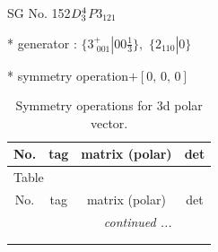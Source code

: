 \documentclass[fleqn,8pt]{jsarticle}
\begin{document}
\setcounter{MaxMatrixCols}{32}

\renewcommand{\tablename}{Table~}
\renewcommand{\figurename}{Figure~}
\begin{center}
\LARGE
SG No. 152\quad$D_{\rm 3}^{4}$\quad$P3_121$\quad[ trigonal ]
\end{center}

* generator : $\{3^{+}_{\,\,001}|0 0 \frac{1}{3}\},\,\,\{2{}_{110}|0\}$

* symmetry operation\quad$+\left[ 0,\, 0,\, 0 \right]$
\renewcommand{\arraystretch}{1.3}
\begin{longtable}{cccc}
\caption{Symmetry operations for 3d polar vector.}
 \\
 \hline \hline
No. & tag & matrix (polar) & det \\ \hline \endfirsthead

\multicolumn{3}{l}{\tablename\ \thetable{}} \\
 \hline \hline
No. & tag & matrix (polar) & det \\ \hline \endhead

 \hline \hline
\multicolumn{3}{r}{\footnotesize\it continued ...} \\ \endfoot

 \hline \hline
\multicolumn{3}{r}{} \\ \endlastfoot


\end{longtable}
\end{document}
